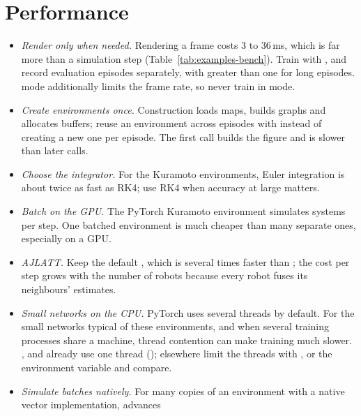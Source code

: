 \section{Performance}\label{sec:trouble-performance}

\begin{itemize}
  \item \emph{Render only when needed.} Rendering a frame costs 3 to 36\,ms,
    which is far more than a simulation step (Table~\ref{tab:examples-bench}).
    Train with , and record evaluation episodes
    separately, with  greater than one for long episodes.
     mode additionally limits the frame rate, so never train in
     mode.
  \item \emph{Create environments once.} Construction loads maps, builds
    graphs and allocates buffers; reuse an environment across episodes with
     instead of creating a new one per episode. The first
     call builds the figure and is slower than later calls.
  \item \emph{Choose the integrator.} For the Kuramoto environments, Euler
    integration is about twice as fast as RK4; use RK4 when accuracy at large
     matters.
  \item \emph{Batch on the GPU.} The PyTorch Kuramoto environment simulates
     systems per step. One batched environment is much
    cheaper than many separate ones, especially on a GPU.
  \item \emph{AJLATT.} Keep the default , which is
    several times faster than ; the cost per step grows with the
    number of robots because every robot fuses its neighbours' estimates.
  \item \emph{Small networks on the CPU.} PyTorch uses several threads by
    default. For the small networks typical of these environments, and when
    several training processes share a machine, thread contention can make
    training much slower. , 
    and  already use one thread (); elsewhere
    limit the threads with ,
     or the environment variable
     and compare.
  \item \emph{Simulate batches natively.} For many copies of an environment
    with a native vector implementation,  advances

\end{itemize}
